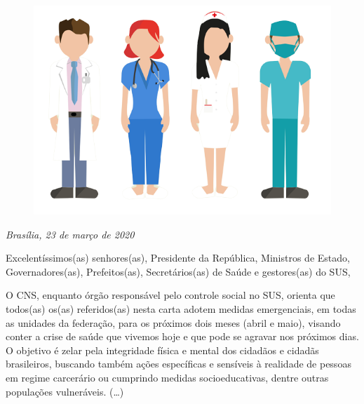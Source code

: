 \begin{myquote}

\begin{figure}[H]
\centering
\includegraphics[scale=0.4]{./imgSAEB_7_POR/media/image30.png}
\end{figure}

\emph{Brasília, 23 de março de 2020}

Excelentíssimos(as) senhores(as), Presidente da República, Ministros de
Estado, Governadores(as), Prefeitos(as), Secretários(as) de Saúde e
gestores(as) do SUS,

O CNS, enquanto órgão responsável pelo controle social no SUS, orienta
que todos(as) os(as) referidos(as) nesta carta adotem medidas
emergenciais, em todas as unidades da federação, para os próximos dois
meses (abril e maio), visando conter a crise de saúde que vivemos hoje e
que pode se agravar nos próximos dias. O objetivo é zelar pela
integridade física e mental dos cidadãos e cidadãs brasileiros, buscando
também ações específicas e sensíveis à realidade de pessoas em regime
carcerário ou cumprindo medidas socioeducativas, dentre outras
populações vulneráveis. (\ldots{})


\end{myquote} 

